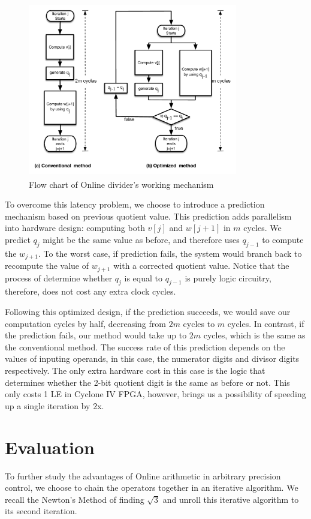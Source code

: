 \documentclass{sig-alternate}
\begin{document}
  	\begin{figure} [ht]
  		\centering
  		\includegraphics[height=3in,width=3.6in]{flowchart}
  		\caption{Flow chart of Online divider's working mechanism}
  	\end{figure}  	
  To overcome this latency problem, we choose to introduce a prediction mechanism based on previous quotient value. This prediction adds parallelism into hardware design: computing both $v[j]$ and $w[j+1]$ in $m$ cycles. We predict $q_{j}$ might be the same value as before, and therefore uses $q_{j-1}$ to compute the $w_{j+1}$. To the worst case, if prediction fails, the system would branch back to recompute the value of $w_{j+1}$ with a corrected quotient value. Notice that the process of determine whether $q_{j}$ is equal to $q_{j-1}$ is purely logic circuitry, therefore, does not cost any extra clock cycles. 

  Following this optimized design, if the prediction succeeds, we would save our computation cycles by half, decreasing from $2m$ cycles to $m$ cycles. In contrast, if the prediction fails, our method would take up to $2m$ cycles, which is the same as the conventional method. The success rate of this prediction depends on the values of inputing operands, in this case, the numerator digits and divisor digits respectively. The only extra hardware cost in this case is the logic that determines whether the 2-bit quotient digit is the same as before or not. This only costs 1 LE in Cyclone IV FPGA, however, brings us a possibility of speeding up a single iteration by 2x. 
  
  \section{Evaluation}   
  To further study the advantages of Online arithmetic in arbitrary precision control, we choose to chain the operators together in an iterative algorithm. We recall the Newton's Method of finding $\sqrt{3}$ and unroll this iterative algorithm to its second iteration.
    
\end{document}
